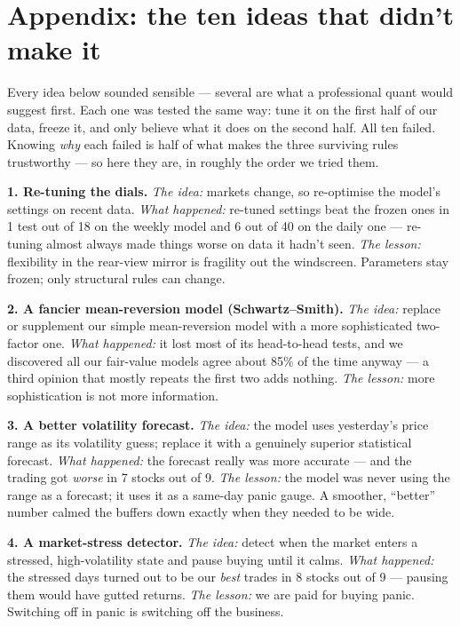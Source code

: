 \documentclass[11pt,a4paper]{article}
\begin{document}
\appendix
\section{Appendix: the ten ideas that didn't make it}

Every idea below sounded sensible --- several are what a professional quant
would suggest first. Each one was tested the same way: tune it on the first
half of our data, freeze it, and only believe what it does on the second
half. All ten failed. Knowing \emph{why} each failed is half of what makes
the three surviving rules trustworthy --- so here they are, in roughly the
order we tried them.

\textbf{1. Re-tuning the dials.} \emph{The idea:} markets change, so
re-optimise the model's settings on recent data. \emph{What happened:}
re-tuned settings beat the frozen ones in 1 test out of 18 on the weekly
model and 6 out of 40 on the daily one --- re-tuning almost always made
things worse on data it hadn't seen. \emph{The lesson:} flexibility in the
rear-view mirror is fragility out the windscreen. Parameters stay frozen;
only structural rules can change.

\textbf{2. A fancier mean-reversion model (Schwartz--Smith).} \emph{The
idea:} replace or supplement our simple mean-reversion model with a more
sophisticated two-factor one. \emph{What happened:} it lost most of its
head-to-head tests, and we discovered all our fair-value models agree about
85\% of the time anyway --- a third opinion that mostly repeats the first
two adds nothing. \emph{The lesson:} more sophistication is not more
information.

\textbf{3. A better volatility forecast.} \emph{The idea:} the model uses
yesterday's price range as its volatility guess; replace it with a genuinely
superior statistical forecast. \emph{What happened:} the forecast really was
more accurate --- and the trading got \emph{worse} in 7 stocks out of 9.
\emph{The lesson:} the model was never using the range as a forecast; it
uses it as a same-day panic gauge. A smoother, ``better'' number calmed the
buffers down exactly when they needed to be wide.

\textbf{4. A market-stress detector.} \emph{The idea:} detect when the
market enters a stressed, high-volatility state and pause buying until it
calms. \emph{What happened:} the stressed days turned out to be our
\emph{best} trades in 8 stocks out of 9 --- pausing them would have gutted
returns. \emph{The lesson:} we are paid for buying panic. Switching off in
panic is switching off the business.
\end{document}

